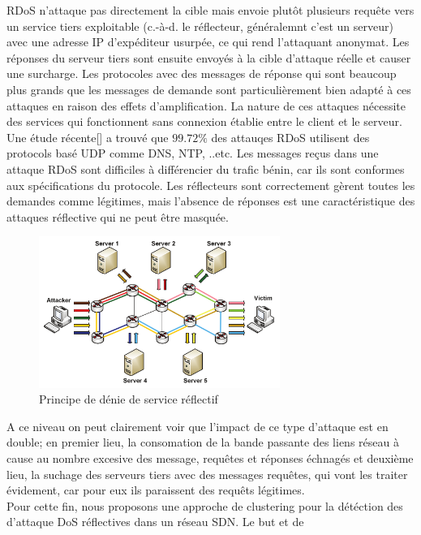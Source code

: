 RDoS n’attaque pas directement la cible mais envoie plutôt plusieurs requête vers un service tiers exploitable (c.-à-d. le réflecteur, généralemnt c'est un serveur) avec une adresse IP d’expéditeur usurpée, ce qui rend l'attaquant anonymat. Les réponses du serveur tiers sont ensuite envoyés à la cible d’attaque réelle et causer une surcharge. Les protocoles avec des messages de réponse qui sont beaucoup plus grands que les messages de demande sont particulièrement bien adapté à ces attaques en raison des effets d’amplification. La nature de ces attaques nécessite des services qui fonctionnent sans connexion établie entre le client et le serveur. Une étude récente[\cite{23}] a trouvé que $ 99.72\% $ des attauqes RDoS utilisent des protocols basé UDP comme DNS, NTP, ..etc. Les messages reçus dans une attaque RDoS sont difficiles à différencier du trafic bénin, car ils sont conformes aux spécifications du protocole. Les réflecteurs sont correctement gèrent toutes les demandes comme légitimes, mais l’absence de réponses est une caractéristique des attaques réflective qui ne peut être masquée. 

\begin{figure}[h]
\centering
\includegraphics[width=0.7\textwidth]{Figures/rDoS}
\decoRule
\caption{Principe de dénie de service réflectif}
\label{fig:rDoS}
\end{figure} 

A ce niveau on peut clairement voir que l'impact de ce type d'attaque est en double; en premier lieu, la consomation de la bande passante des liens réseau à cause au nombre excesive des message, requêtes et réponses échnagés et deuxième lieu, la suchage des serveurs tiers avec des messages requêtes, qui vont les traiter évidement, car pour eux ils paraissent des requêts légitimes.\\
  
Pour cette fin, nous proposons une approche de clustering pour la détéction des d'attaque DoS réflectives dans un réseau SDN. Le but et de 

